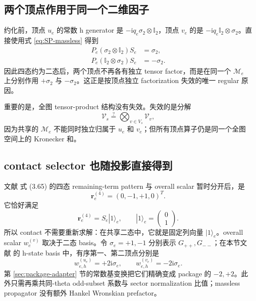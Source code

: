 \documentclass[11pt,a4paper]{ctexart}
\newcommand{\ii}{\mathrm i}
\newcommand{\Id}{\mathbb I}
\newcommand{\cV}{\mathcal V}
\newcommand{\cM}{\mathcal M}
\begin{document}
\subsection{两个顶点作用于同一个二维因子}

约化前，顶点 $u_e$ 的常数 h generator 是 $-\ii q_e\sigma_2\otimes \Id_2$，顶点 $v_e$ 的是 $-\ii q_e\Id_2\otimes\sigma_2$。直接使用式 \eqref{eq:SP-massless} 得到
\begin{align}
 P_e(\sigma_2\otimes \Id_2)S_e&=\sigma_2,
 \label{eq:first-endpoint-projection}\\
 P_e(\Id_2\otimes\sigma_2)S_e&=-\sigma_2.
 \label{eq:second-endpoint-projection}
\end{align}
因此四态约为二态后，两个顶点不再各有独立 tensor factor，而是在同一个 $\cM_e$ 上分别作用 $+\sigma_2$ 与 $-\sigma_2$。这正是按顶点独立 factorization 失效的唯一 regular 原因。

重要的是，全图 tensor-product 结构没有失效。失效的是分解
\begin{equation}
 \cV_s\stackrel{?}{=}\bigotimes_{v\in V_s}\cV_v,
\end{equation}
因为共享的 $\cM_e$ 不能同时独立归属于 $u_e$ 和 $v_e$；但所有顶点算子仍是同一个全图空间上的 Kronecker 和。

\subsection{contact selector 也随投影直接得到}

文献 \cite{Chen:2023eic} 式 (3.65) 的四态 remaining-term pattern 与 overall scalar 暂时分开后，是
\begin{equation}
 \bm r_e^{(4)}=(0,-1,+1,0)^T.
\end{equation}
它恰好满足
\begin{equation}
 \bm r_e^{(4)}=S_e|1\rangle_e,
 \qquad
 |1\rangle_e=\begin{pmatrix}0\\1\end{pmatrix}.
 \label{eq:contact-vector-projection}
\end{equation}
所以 contact 不需要重新求解：在共享二态中，它就是固定列向量 $|1\rangle_e$。overall scalar $w_e^{(v)}$ 取决于二态 basis。令 $\sigma_e=+1,-1$ 分别表示 $G_{++},G_{--}$；在本节文献 \cite{Chen:2023eic} 的 h-state basis 中，有序第一、第二顶点分别是
\begin{equation}
 w_{e,h}^{(u_e)}=+2\ii\sigma_e,
 \qquad
 w_{e,h}^{(v_e)}=-2\ii\sigma_e.
 \label{eq:h-massless-contact-weight}
\end{equation}
第 \ref{sec:package-adapter} 节的常数基变换把它们精确变成 package 的 $-2,+2$。此外只需再乘共同-theta odd-subset 系数与 sector normalization 比值；massless propagator 没有额外 Hankel Wronskian prefactor。
\end{document}
